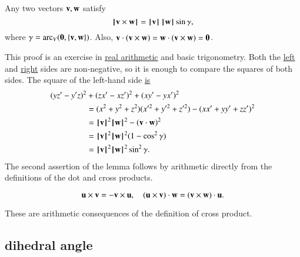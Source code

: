 \begin{lemma}[]  
\label{lemma:los-cross}
Any two vectors ${\mathbf v},{\mathbf w}$ satisfy
\begin{displaymath}{{\hskip0.1em|\hskip-0.15em|\hskip0.1em}{\mathbf v}\times {\mathbf w}{\hskip0.1em|\hskip-0.15em|\hskip0.1em}} =
  {{\hskip0.1em|\hskip-0.15em|\hskip0.1em}{\mathbf v}{\hskip0.1em|\hskip-0.15em|\hskip0.1em}}\,{{\hskip0.1em|\hskip-0.15em|\hskip0.1em}{\mathbf w}{\hskip0.1em|\hskip-0.15em|\hskip0.1em}}\sin\gamma,\end{displaymath}
where $\gamma=\operatorname{arc}_V({\mathbf 0},\{{\mathbf v},{\mathbf w}\})$.
Also, ${\mathbf v} \cdot ({\mathbf v}\times {\mathbf w}) = {\mathbf w}\cdot ({\mathbf v}\times {\mathbf w}) = {\mathbf 0}$.
\end{lemma}

\begin{proved} This proof is an exercise in
  \hyperref[back:analysis]{real arithmetic} and basic trigonometry.
  Both the \hyperref[eqn:dot]{left} and
  \hyperref[lemma:sin-pos]{right} sides are non-negative, so it is
  enough to compare the squares of both sides.  The square of the
  left-hand side \hyperref[def:cross]{is}
\begin{align*}
  (y z'- y'z)^2 &+ (z x' - x z')^2 + (x y' - y x')^2 \\
  &= %
  (x^2 + y^2 + z^2)(x'^2 + y'^2 + z'^2) - (x x' + y y' + z z')^2
  \\&= %
  \normo{\v}^2\normo{\w}^2 - (\v\cdot \w)^2 \\
  &= %
  \normo{\v}^2\normo{\w}^2 ( 1 - \cos^2\gamma)\\
  &= %
\normo{\v}^2\normo{\w}^2 \sin^2\gamma.
\end{align*}
The second assertion of the lemma follows by arithmetic directly from
the definitions of the dot and cross products.  \swallowed\end{proved}


\begin{lemma}[]
\begin{displaymath}
{\mathbf u}\times {\mathbf v} = -{\mathbf v}\times {\mathbf u},\quad
({\mathbf u}\times {\mathbf v})\cdot {\mathbf w} = ({\mathbf v}\times {\mathbf w})\cdot {\mathbf u}.
\end{displaymath}
\end{lemma}

\begin{proved}
These are arithmetic consequences of the definition of cross product.
\swallowed\end{proved}



\subsection{dihedral angle}

